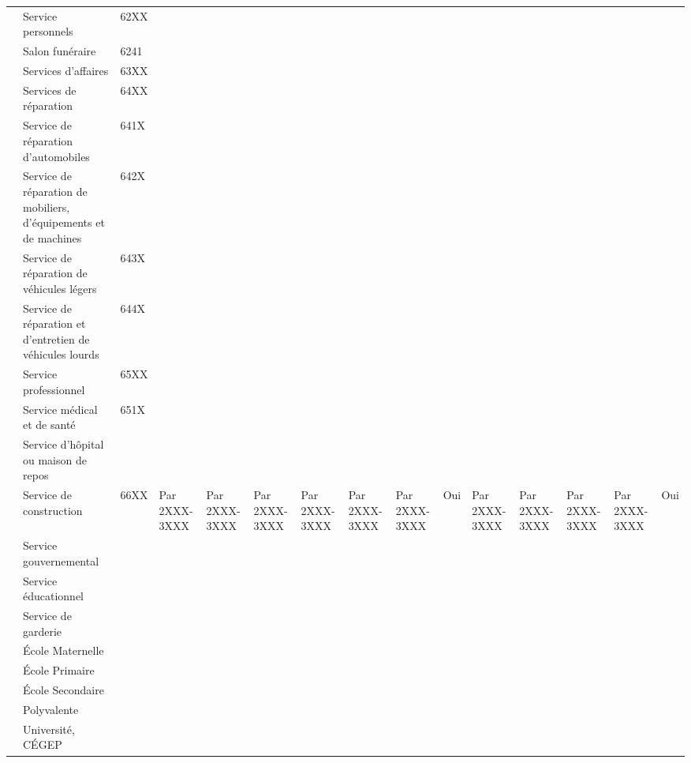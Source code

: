 \begin{landscape}
\begin{center}
\begin{longtable}{m{0.5cm} | p{2.5cm}  *{13}{|m{1.2cm}}|}
        & Service personnels & \hspace{3mm}62XX\\
        & Salon funéraire& \hspace{9mm}6241\\
        & Services d'affaires & \hspace{3mm}63XX\\
        & Services de réparation & \hspace{3mm}64XX\\
        & Service de réparation d'automobiles& \hspace{6mm}641X\\
        & Service de réparation de mobiliers, d'équipements et de machines & \hspace{6mm}642X\\ 
        & Service de réparation de véhicules légers& \hspace{6mm}643X\\
        & Service de réparation et d'entretien de véhicules lourds& \hspace{6mm}644X\\
        & Service professionnel & \hspace{3mm}65XX\\
        & Service médical et de santé & \hspace{3mm}651X\\
        & Service d'hôpital ou maison de repos & \hspace{9mm}\\
        & Service de construction & 66XX & Par 2XXX-3XXX  & Par 2XXX-3XXX &Par 2XXX-3XXX &Par 2XXX-3XXX &Par 2XXX-3XXX &Par 2XXX-3XXX & Oui & Par 2XXX-3XXX & Par 2XXX-3XXX & Par 2XXX-3XXX & Par 2XXX-3XXX & Oui\\
        & Service gouvernemental \\
        & Service éducationnel \\
        & Service de garderie \\
        & École Maternelle \\
        & École Primaire \\
        & École Secondaire \\
        & Polyvalente \\
        & Université, CÉGEP \\

\end{longtable}
\end{center}
\end{landscape}
